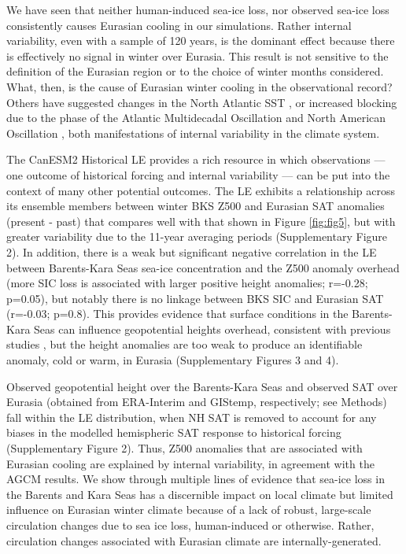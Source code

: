 \documentclass{nature}
\begin{document}
We have seen that neither human-induced sea-ice loss, nor observed sea-ice loss consistently causes Eurasian cooling in our simulations. Rather internal variability, even with a sample of 120 years, is the dominant effect because there is effectively no signal in winter over Eurasia. This result is not sensitive to the definition of the Eurasian region or to the choice of winter months considered. What, then, is the cause of Eurasian winter cooling in the observational record? Others have suggested changes in the North Atlantic SST \cite{sato14}, or increased blocking due to the phase of the Atlantic Multidecadal Oscillation and North American Oscillation \cite{peings14b}, both manifestations of internal variability in the climate system. 

The CanESM2 Historical LE provides a rich resource in which observations --- one outcome of historical forcing and internal variability --- can be put into the context of many other potential outcomes. The LE exhibits a relationship across its ensemble members between winter BKS Z500 and Eurasian SAT anomalies (present - past) that compares well with that shown in Figure \ref{fig:fig5}, but with greater variability due to the 11-year averaging periods (Supplementary Figure 2). In addition, there is a weak but significant negative correlation in the LE between Barents-Kara Seas sea-ice concentration and the Z500 anomaly overhead (more SIC loss is associated with larger positive height anomalies; r=-0.28; p=0.05), but notably there is no linkage between BKS SIC and Eurasian SAT (r=-0.03; p=0.8). This provides evidence that surface conditions in the Barents-Kara Seas can influence geopotential heights overhead, consistent with previous studies \cite{honda09,mori14}, but the height anomalies are too weak to produce an identifiable anomaly, cold or warm, in Eurasia (Supplementary Figures 3 and 4). 

Observed geopotential height over the Barents-Kara Seas and observed SAT over Eurasia (obtained from ERA-Interim and GIStemp, respectively; see Methods) fall within the LE distribution, when NH SAT is removed to account for any biases in the modelled hemispheric SAT response to historical forcing (Supplementary Figure 2). Thus, Z500 anomalies that are associated with Eurasian cooling are explained by internal variability, in agreement with the AGCM results. We show through multiple lines of evidence that sea-ice loss in the Barents and Kara Seas has a discernible impact on local climate but limited influence on Eurasian winter climate because of a lack of robust, large-scale circulation changes due to sea ice loss, human-induced or otherwise. Rather, circulation changes associated with Eurasian climate are internally-generated.  
\end{document}
